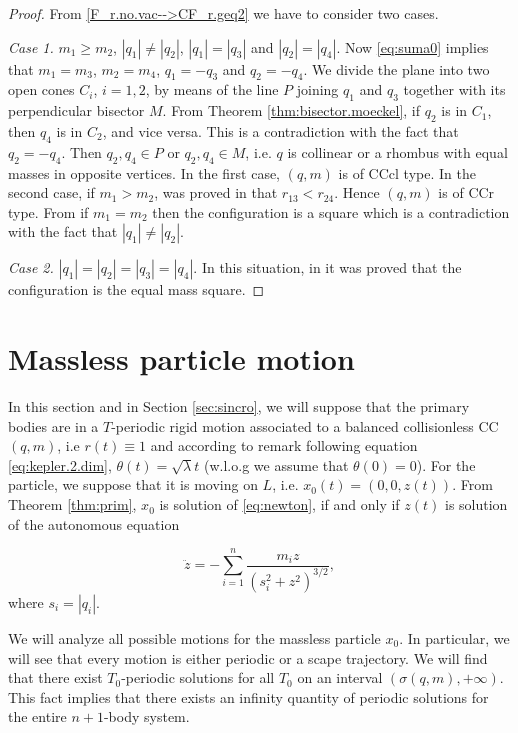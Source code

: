 \documentclass[smallcondensed]{svjour3}
\begin{document}
\begin{proof}
From \eqref{F_r.no.vac-->CF_r.geq2} we have to consider two cases.

\emph{Case 1.}  $m_1\geq m_2$, $|q_1|\neq|q_2|$, $|q_1|=|q_3|$ and $|q_2|=|q_4|$. Now \eqref{eq:suma0} implies that
 $m_1=m_3$, $m_2=m_4$, $q_1=-q_3$ and $q_2=-q_4$.  We divide the plane into two open cones $C_i$, $i=1,2$, by means of  the line $P$ joining $q_1$  and $q_3$ together with its perpendicular bisector $M$.  From Theorem \ref{thm:bisector.moeckel}, if  $q_2$  is in $C_1$, then  $q_4$ is in $C_2$, and vice versa. This is a contradiction with the fact that $q_2=-q_4$. Then $q_2,q_4\in P$ or $q_2,q_4\in M$, i.e. $q$ is collinear or a rhombus with equal masses in opposite vertices. In the first case, $(q,m)$ is of  CCcl type. In the second case, if $m_1>m_2$,   was proved in \cite[Eqs. $(3.44)$ and $(3.45)$]{long2002four} that $r_{13}<r_{24}$. Hence $(q,m)$ is of  CCr type. From \cite[Corollary 2]{perez2007convex} if $m_1=m_2$ then the configuration is a square which is a contradiction with the fact that $|q_1|\neq|q_2|$.

\emph{Case 2.} $|q_1|=|q_2|=|q_3|=|q_4|$. In this situation,   in \cite{hampton2005co} it was proved that the configuration is the equal mass square.
\end{proof}

\section{Massless particle motion}\label{sec:mas-mot}

In this section and in Section \ref{sec:sincro},  we will suppose that the primary bodies are in a $T$-periodic rigid motion associated to a balanced collisionless CC $(q,m)$, i.e  $r(t)\equiv 1$ and according to remark following equation \eqref{eq:kepler.2.dim}, $\theta (t)=\sqrt{\lambda}t$  (w.l.o.g  we  assume that $\theta(0)=0$). For the particle, we suppose that it is moving on $L$, i.e. $x_0(t)=(0,0,z(t))$. From Theorem \ref{thm:prim}, $x_0$ is solution of \eqref{eq:newton}, if and only if $z(t)$ is solution of the autonomous equation



\begin{equation}\label{eq:eq_new_red}
 \ddot{z}=-\sum_{i=1}^n\frac{m_iz}{(s_i^2+z^2)^{3/2}},
\end{equation}
where $s_i=|q_i|$.

We will analyze all possible motions for the massless particle $x_0$. In particular, we will see that every motion is either periodic or a scape trajectory. We will find that there exist $T_0$-periodic solutions for all $T_0$ on an interval  $(\sigma(q,m),+\infty)$. This fact implies that there exists an infinity quantity of periodic solutions for the entire $n+1$-body system.
\end{document}
